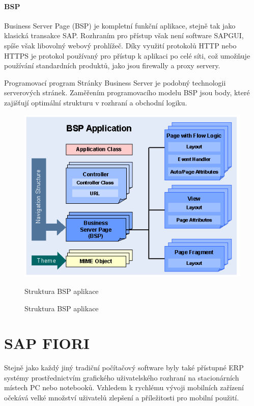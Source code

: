 \documentclass[thesis=M,czech]{FITthesis}[2012/06/26]
\begin{document}
\paragraph{BSP} Business Server Page (BSP) je kompletní funkční aplikace, stejně tak jako klasická transakce SAP. Rozhraním pro přístup však není software SAPGUI, spíše však libovolný webový prohlížeč. Díky využití protokolů HTTP nebo HTTPS je protokol používaný pro přístup k aplikaci po celé síti, což umožňuje používání standardních produktů, jako jsou firewally a proxy servery.

Programovací program Stránky Business Server je podobný technologii serverových stránek. Zaměřením programovacího modelu BSP jsou body, které zajišťují optimální strukturu v rozhraní a obchodní logiku.

\begin{figure}[H]
	\centering
	\includegraphics[width=1\textwidth]{images/bsp.png}
	\caption{Struktura BSP aplikace}
	\label{img:bsp}
	\small
	Struktura BSP aplikace
\end{figure}

\section{SAP FIORI}

Stejně jako každý jiný tradiční počítačový software byly také přístupné ERP systémy prostřednictvím grafického uživatelského rozhraní na stacionárních místech PC nebo notebooků. Vzhledem k rychlému vývoji mobilních zařízení očekává velké množství uživatelů zlepšení a příležitosti pro mobilní použití.
\end{document}

